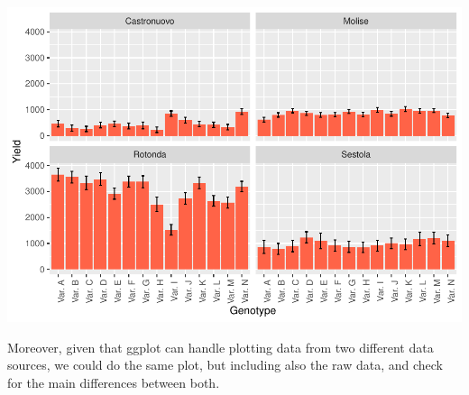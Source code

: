 \documentclass[
]{book}
\begin{document}
\includegraphics{PPB-Toolkit-for-R-and-R-Studio_files/figure-latex/unnamed-chunk-120-1.pdf}

Moreover, given that ggplot can handle plotting data from two different data sources, we could do the same plot, but including also the raw data, and check for the main differences between both.
\end{document}
